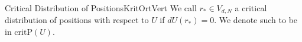 \begin{mdef}{Critical Distribution of Positions}{KritOrtVert}
    We call $r_*\in V_{d,N}$ a critical distribution of positions with respect to $U$ if $dU(r_*) = 0$. We denote such to be in $\text{critP}(U)$.
\end{mdef}